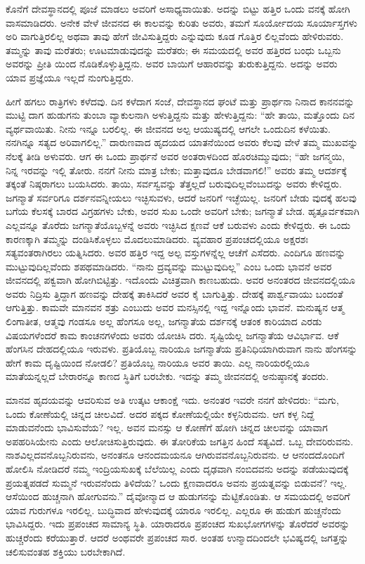 ಕೊನೆಗೆ ದೇವಸ್ಥಾನದಲ್ಲಿ ಪೂಜೆ ಮಾಡಲು ಅವರಿಗೆ ಅಸಾಧ್ಯವಾಯಿತು. ಅದನ್ನು ಬಿಟ್ಟು ಹತ್ತಿರ ಒಂದು ವನಕ್ಕೆ ಹೋಗಿ ವಾಸಮಾಡಿದರು. ಅನೇಕ ವೇಳೆ ಜೀವನದ ಈ ಕಾಲವನ್ನು ಕುರಿತು ಅವರು, ತಮಗೆ ಸೂರ್ಯೋದಯ ಸೂರ್ಯಾಸ್ತಗಳು ಅರಿ ವಾಗುತ್ತಿರಲಿಲ್ಲ ಅಥವಾ ತಾವು ಹೇಗೆ ಜೀವಿಸುತ್ತಿದ್ದರು ಎನ್ನುವುದು ಕೂಡ ಗೊತ್ತಿರ ಲಿಲ್ಲವೆಂದು ಹೇಳಿರುವರು. ತಮ್ಮನ್ನು ತಾವು ಮರೆತರು; ಊಟಮಾಡುವುದನ್ನು ಮರೆತರು; ಈ ಸಮಯದಲ್ಲಿ ಅವರ ಹತ್ತಿರದ ಬಂಧು ಒಬ್ಬನು ಅವರನ್ನು ಪ್ರೀತಿ ಯಿಂದ ನೊಡಿಕೊಳ್ಳುತ್ತಿದ್ದನು. ಅವರ ಬಾಯಿಗೆ ಆಹಾರವನ್ನು ತುರುಕುತ್ತಿದ್ದನು. ಅದನ್ನು ಅವರು ಯಾವ ಪ್ರಜ್ಞೆಯೂ ಇಲ್ಲದೆ ನುಂಗುತ್ತಿದ್ದರು.

ಹೀಗೆ ಹಗಲು ರಾತ್ರಿಗಳು ಕಳೆದವು. ದಿನ ಕಳೆದಾಗ ಸಂಜೆ, ದೇವಸ್ಥಾನದ ಘಂಟೆ ಮತ್ತು ಪ್ರಾರ್ಥನಾ ನಿನಾದ ಕಾನನವನ್ನು ಮುಟ್ಟಿ ದಾಗ ಹುಡುಗನು ತುಂಬಾ ವ್ಯಾಕುಲನಾಗಿ ಅಳುತ್ತಿದ್ದನು ಮತ್ತು ಹೇಳುತ್ತಿದ್ದನು: “ಹೇ ತಾಯಿ, ಮತ್ತೊಂದು ದಿನ ವ್ಯರ್ಥವಾಯಿತು. ನೀನು ಇನ್ನೂ ಬರಲಿಲ್ಲ. ಈ ಜೀವನದ ಅಲ್ಪ ಆಯುಷ್ಯದಲ್ಲಿ ಆಗಲೇ ಒಂದುದಿನ ಕಳೆಯಿತು. ನನಗಿನ್ನೂ ಸತ್ಯದ ಅರಿವಾಗಲಿಲ್ಲ.” ದಾರುಣವಾದ ಹೃದಯದ ಯಾತನೆಯಿಂದ ಅವರು ಕೆಲವು ವೇಳೆ ತಮ್ಮ ಮುಖವನ್ನು ನೆಲಕ್ಕೆ ತೀಡಿ ಅಳುವರು. ಆಗ ಈ ಒಂದು ಪ್ರಾರ್ಥನೆ ಅವರ ಅಂತರಾಳದಿಂದ ಹೊರಚಿಮ್ಮುವುದು; “ಹೇ ಜಗನ್ಮಯಿ, ನಿನ್ನ ಇರವನ್ನು ಇಲ್ಲಿ ತೋರು. ನನಗೆ ನೀನು ಮಾತ್ರ ಬೇಕು; ಮತ್ತಾವುದೂ ಬೇಡವಾಗಲಿ!” ಅವರು ತಮ್ಮ ಆದರ್ಶಕ್ಕೆ ತಕ್ಕಂತೆ ನಿಷ್ಠರಾಗಲು ಬಯಸಿದರು. ತಾಯಿ, ಸರ್ವಸ್ವವನ್ನು ತೆತ್ತಲ್ಲದೆ ಬರುವುದಿಲ್ಲವೆಂಬುದನ್ನು ಅವರು ಕೇಳಿದ್ದರು. ಜಗನ್ಮಾತೆ ಸರ್ವರಿಗೂ ದರ್ಶನವನ್ನೀಯಲು ಇಚ್ಛಿಸುವಳು, ಆದರೆ ಜನರಿಗೆ ಇಚ್ಛೆಯಿಲ್ಲ. ಜನರಿಗೆ ಬೇಡು ವುದಕ್ಕೆ ಹಲವು ಬಗೆಯ ಕೆಲಸಕ್ಕೆ ಬಾರದ ವಿಗ್ರಹಗಳು ಬೇಕು, ಅವರ ಸುಖ ಒಂದೇ ಅವರಿಗೆ ಬೇಕು; ಜಗನ್ಮಾತೆ ಬೇಡ. ಹೃತ್ಪೂರ್ವಕವಾಗಿ ಎಲ್ಲವನ್ನೂ ತೊರೆದು ಜಗನ್ಮಾತೆಯೊಬ್ಬಳನ್ನೆ ಅವರು ಇಚ್ಛಿಸಿದ ಕ್ಷಣವೆ ಆಕೆ ಬರುವಳು ಎಂದು ಕೇಳಿದ್ದರು. ಈ ಒಂದು ಕಾರಣಕ್ಕಾಗಿ ತಮ್ಮನ್ನು ದಂಡಿಸಿಕೊಳ್ಳಲು ಮೊದಲುಮಾಡಿದರು. ವ್ಯವಹಾರ ಪ್ರಪಂಚದಲ್ಲಿಯೂ ಅಕ್ಷರಶಃ ಸತ್ಯವಂತರಾಗಿರಲು ಯತ್ನಿಸಿದರು. ಅವರ ಹತ್ತಿರ ಇದ್ದ ಅಲ್ಪ ವಸ್ತುಗಳನ್ನೆಲ್ಲ ಆಚೆಗೆ ಎಸೆದರು. ಎಂದಿಗೂ ಹಣವನ್ನು ಮುಟ್ಟುವುದಿಲ್ಲವೆಂದು ಶಪಥಮಾಡಿದರು. “ನಾನು ದ್ರವ್ಯವನ್ನು ಮುಟ್ಟುವುದಿಲ್ಲ” ಎಂಬ ಒಂದು ಭಾವನೆ ಅವರ ಜೀವನದಲ್ಲಿ ಪಕ್ವವಾಗಿ ಹೋಗಿಬಿಟ್ಟಿತ್ತು. ಇದೊಂದು ವಿಚಿತ್ರವಾಗಿ ಕಾಣಬಹುದು. ಅವರ ಅನಂತರದ ಜೀವನದಲ್ಲಿಯೂ ಅವರು ನಿದ್ರಿಸು ತ್ತಿದ್ದಾಗ ಹಣವನ್ನು ದೇಹಕ್ಕೆ ತಾಕಿಸಿದರೆ ಅವರ ಕೈ ಬಾಗುತ್ತಿತ್ತು. ದೇಹಕ್ಕೆ ಪಾರ್ಶ್ವವಾಯು ಬಂದಂತೆ ಆಗುತ್ತಿತ್ತು. ಕಾಮವೇ ಮಾನವನ ಶತ್ರು ಎಂಬುದು ಅವರ ಮನಸ್ಸಿನಲ್ಲಿ ಇದ್ದ ಇನ್ನೊಂದು ಭಾವನೆ. ಮನುಷ್ಯನ ಆತ್ಮ ಲಿಂಗಾತೀತ, ಆತ್ಮವು ಗಂಡಸೂ ಅಲ್ಲ ಹೆಂಗಸೂ ಅಲ್ಲ, ಜಗನ್ಮಾತೆಯ ದರ್ಶನಕ್ಕೆ ಆತಂಕ ಕಾರಿಯಾದ ಎರಡು ವಿಷಯಗಳೆಂದರೆ ಕಾಮ ಕಾಂಚನಗಳೆಂದು ಅವರು ಯೋಚಿಸಿ ದರು. ಸೃಷ್ಟಿಯೆಲ್ಲ ಜಗನ್ಮಾತೆಯ ಆವಿರ್ಭಾವ. ಆಕೆ ಹೆಂಗಸಿನ ದೇಹದಲ್ಲಿಯೂ ಇರುವಳು. ಪ್ರತಿಯೊಬ್ಬ ನಾರಿಯೂ ಜಗನ್ಮಾತೆಯ ಪ್ರತಿನಿಧಿಯಾಗಿರುವಾಗ ನಾನು ಹೆಂಗಸನ್ನು ಹೇಗೆ ಕಾಮ ದೃಷ್ಟಿಯಿಂದ ನೋಡಲಿ? ಪ್ರತಿಯೊಬ್ಬ ನಾರಿಯೂ ಅವರ ತಾಯಿ. ಎಲ್ಲ ನಾರಿಯರಲ್ಲಿಯೂ ಮಾತೆಯನ್ನಲ್ಲದೆ ಬೇರಾರನ್ನೂ ಕಾಣದ ಸ್ಥಿತಿಗೆ ಬರಬೇಕು. ಇದನ್ನು ತಮ್ಮ ಜೀವನದಲ್ಲಿ ಅನುಷ್ಠಾನಕ್ಕೆ ತಂದರು.

ಮಾನವ ಹೃದಯವನ್ನು ಆವರಿಸುವ ಅತಿ ಉತ್ಕಟ ಆಕಾಂಕ್ಷೆ ಇದು. ಅನಂತರ ಇವರೇ ನನಗೆ ಹೇಳಿದರು: “ಮಗು, ಒಂದು ಕೋಣೆಯಲ್ಲಿ ಚಿನ್ನದ ಚೀಲವಿದೆ. ಅದರ ಪಕ್ಕದ ಕೋಣೆಯಲ್ಲಿಯೇ ಕಳ್ಳನಿರುವನು. ಆಗ ಕಳ್ಳ ನಿದ್ದೆ ಮಾಡುವನೆಂದು ಭಾವಿಸುವೆಯ? ಇಲ್ಲ. ಅವನ ಮನಸ್ಸು ಆ ಕೋಣೆಗೆ ಹೋಗಿ ಚಿನ್ನದ ಚೀಲವನ್ನು ಯಾವಾಗ ಅಪಹರಿಸಿಯೇನು ಎಂದು ಆಲೋಚಿಸುತ್ತಿರುವುದು. ಈ ತೋರಿಕೆಯ ಜಗತ್ತಿನ ಹಿಂದೆ ಸತ್ಯವಿದೆ. ಒಬ್ಬ ದೇವರಿರುವನು. ನಾಶವಿಲ್ಲದವನೊಬ್ಬನಿರುವನು, ಅನಂತನೂ ಆನಂದಮಯನೂ ಆಗಿರುವವನೊಬ್ಬನಿರುವನು. ಆ ಆನಂದದೊಂದಿಗೆ ಹೋಲಿಸಿ ನೋಡಿದರೆ ನಮ್ಮ ಇಂದ್ರಿಯಸುಖಕ್ಕೆ ಬೆಲೆಯಿಲ್ಲ ಎಂದು ದೃಢವಾಗಿ ನಂಬಿದವನು ಅದನ್ನು ಪಡೆಯುವುದಕ್ಕೆ ಪ್ರಯತ್ನಪಡದೆ ಸುಮ್ಮನೆ ಇರುವನೆಂದು ತಿಳಿದೆಯ? ಒಂದು ಕ್ಷಣವಾದರೂ ಅವನು ಪ್ರಯತ್ನವನ್ನು ಬಿಡುವನೆ? ಇಲ್ಲ. ಆಸೆಯಿಂದ ಹುಚ್ಚನಾಗಿ ಹೋಗುವನು.” ದೈವೋನ್ಮಾದ ಆ ಹುಡುಗನನ್ನು ಮೆಟ್ಟಿಕೊಂಡಿತು. ಆ ಸಮಯದಲ್ಲಿ ಅವರಿಗೆ ಯಾವ ಗುರುಗಳೂ ಇರಲಿಲ್ಲ. ಬುದ್ಧಿವಾದ ಹೇಳುವುದಕ್ಕೆ ಯಾರೂ ಇರಲಿಲ್ಲ. ಎಲ್ಲರೂ ಈ ಹುಡುಗ ಹುಚ್ಚನೆಂದು ಭಾವಿಸಿದ್ದರು. ಇದು ಪ್ರಪಂಚದ ಸಾಮಾನ್ಯ ಸ್ಥಿತಿ. ಯಾರಾದರೂ ಪ್ರಪಂಚದ ಸುಖಭೋಗಗಳನ್ನು ತೊರೆದರೆ ಅವರನ್ನು ಹುಚ್ಚರೆಂದು ಕರೆಯುತ್ತಾರೆ. ಆದರೆ ಅಂಥವರೇ ಪ್ರಪಂಚದ ಸಾರ. ಅಂತಹ ಉನ್ಮಾದದಿಂದಲೇ ಭವಿಷ್ಯದಲ್ಲಿ ಜಗತ್ತನ್ನು ಚಲಿಸುವಂತಹ ಶಕ್ತಿಯು ಬರಬೇಕಾಗಿದೆ.

